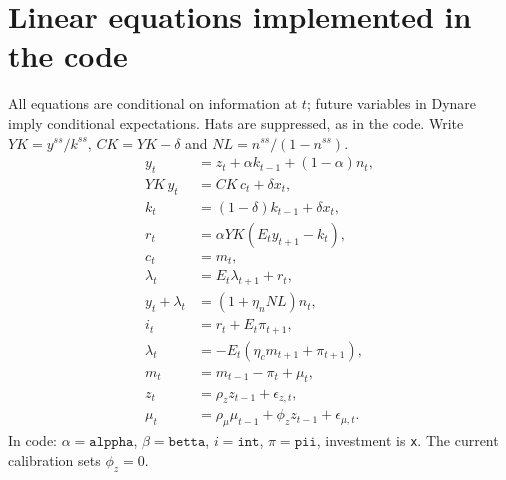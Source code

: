 \documentclass[11pt,a4paper]{article}
\begin{document}
\section*{Linear equations implemented in the code}
All equations are conditional on information at $t$; future variables in
Dynare imply conditional expectations. Hats are suppressed, as in the code.
Write $YK=y^{ss}/k^{ss}$, $CK=YK-\delta$ and $NL=n^{ss}/(1-n^{ss})$.
\begin{align*}
y_t&=z_t+\alpha k_{t-1}+(1-\alpha)n_t,\\
YK\,y_t&=CK\,c_t+\delta x_t,\\
k_t&=(1-\delta)k_{t-1}+\delta x_t,\\
r_t&=\alpha YK(E_ty_{t+1}-k_t),\\
c_t&=m_t,\\
\lambda_t&=E_t\lambda_{t+1}+r_t,\\
y_t+\lambda_t&=(1+\eta_n NL)n_t,\\
i_t&=r_t+E_t\pi_{t+1},\\
\lambda_t&=-E_t(\eta_c m_{t+1}+\pi_{t+1}),\\
m_t&=m_{t-1}-\pi_t+\mu_t,\\
z_t&=\rho_z z_{t-1}+\epsilon_{z,t},\\
\mu_t&=\rho_\mu\mu_{t-1}+\phi_z z_{t-1}+\epsilon_{\mu,t}.
\end{align*}
In code: $\alpha=\texttt{alppha}$, $\beta=\texttt{betta}$,
$i=\texttt{int}$, $\pi=\texttt{pii}$, investment is \texttt{x}.
The current calibration sets $\phi_z=0$.
\end{document}
